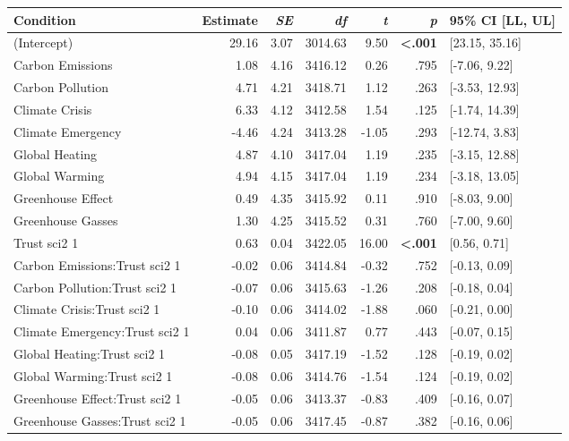 \begin{table}[ht]
\centering
\begin{tabular}{lrrrrrl}
  \hline
Condition & Estimate & \textit{SE} & \textit{df} & \textit{t} & \textit{p} & 95\% CI [LL, UL] \\ 
  \hline
(Intercept) & 29.16 & 3.07 & 3014.63 & 9.50 & \textbf{\textless  .001} & [23.15, 35.16] \\ 
  Carbon Emissions & 1.08 & 4.16 & 3416.12 & 0.26 & .795 & [-7.06, 9.22] \\ 
  Carbon Pollution & 4.71 & 4.21 & 3418.71 & 1.12 & .263 & [-3.53, 12.93] \\ 
  Climate Crisis & 6.33 & 4.12 & 3412.58 & 1.54 & .125 & [-1.74, 14.39] \\ 
  Climate Emergency & -4.46 & 4.24 & 3413.28 & -1.05 & .293 & [-12.74, 3.83] \\ 
  Global Heating & 4.87 & 4.10 & 3417.04 & 1.19 & .235 & [-3.15, 12.88] \\ 
  Global Warming & 4.94 & 4.15 & 3417.04 & 1.19 & .234 & [-3.18, 13.05] \\ 
  Greenhouse Effect & 0.49 & 4.35 & 3415.92 & 0.11 & .910 & [-8.03, 9.00] \\ 
  Greenhouse Gasses & 1.30 & 4.25 & 3415.52 & 0.31 & .760 & [-7.00, 9.60] \\ 
  Trust sci2 1 & 0.63 & 0.04 & 3422.05 & 16.00 & \textbf{\textless  .001} & [0.56, 0.71] \\ 
  Carbon Emissions:Trust sci2 1 & -0.02 & 0.06 & 3414.84 & -0.32 & .752 & [-0.13, 0.09] \\ 
  Carbon Pollution:Trust sci2 1 & -0.07 & 0.06 & 3415.63 & -1.26 & .208 & [-0.18, 0.04] \\ 
  Climate Crisis:Trust sci2 1 & -0.10 & 0.06 & 3414.02 & -1.88 & .060 & [-0.21, 0.00] \\ 
  Climate Emergency:Trust sci2 1 & 0.04 & 0.06 & 3411.87 & 0.77 & .443 & [-0.07, 0.15] \\ 
  Global Heating:Trust sci2 1 & -0.08 & 0.05 & 3417.19 & -1.52 & .128 & [-0.19, 0.02] \\ 
  Global Warming:Trust sci2 1 & -0.08 & 0.06 & 3414.76 & -1.54 & .124 & [-0.19, 0.02] \\ 
  Greenhouse Effect:Trust sci2 1 & -0.05 & 0.06 & 3413.37 & -0.83 & .409 & [-0.16, 0.07] \\ 
  Greenhouse Gasses:Trust sci2 1 & -0.05 & 0.06 & 3417.45 & -0.87 & .382 & [-0.16, 0.06] \\ 
   \hline
\end{tabular}
\end{table}
